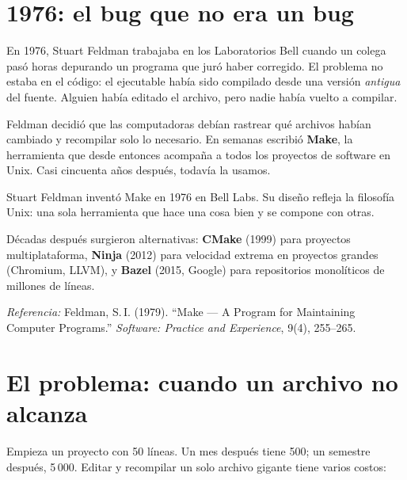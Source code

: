 \documentclass[12pt, oneside]{article}
\begin{document}

\tableofcontents
\newpage

\section{1976: el bug que no era un bug}

En 1976, Stuart Feldman trabajaba en los Laboratorios Bell cuando un colega
pasó horas depurando un programa que juró haber corregido.  El problema no
estaba en el código: el ejecutable había sido compilado desde una versión
\textit{antigua} del fuente.  Alguien había editado el archivo, pero nadie
había vuelto a compilar.

Feldman decidió que las computadoras debían rastrear qué archivos habían
cambiado y recompilar solo lo necesario.  En semanas escribió
\textbf{Make}, la herramienta que desde entonces acompaña a todos los
proyectos de software en Unix.  Casi cincuenta años después, todavía la
usamos.

\begin{tecnico}
  Stuart Feldman inventó Make en 1976 en Bell Labs.  Su diseño refleja la
  filosofía Unix: una sola herramienta que hace una cosa bien y se compone
  con otras.
  \par\smallskip
  Décadas después surgieron alternativas: \textbf{CMake} (1999) para
  proyectos multiplataforma, \textbf{Ninja} (2012) para velocidad extrema
  en proyectos grandes (Chromium, LLVM), y \textbf{Bazel} (2015, Google)
  para repositorios monolíticos de millones de líneas.
  \par\smallskip
  \textit{Referencia:} Feldman, S.\,I. (1979). ``Make — A Program for
  Maintaining Computer Programs.'' \textit{Software: Practice and
  Experience}, 9(4), 255–265.
\end{tecnico}

\section{El problema: cuando un archivo no alcanza}

Empieza un proyecto con 50 líneas.  Un mes después tiene 500; un semestre
después, 5\,000.  Editar y recompilar un solo archivo gigante tiene varios
costos:
\end{document}
